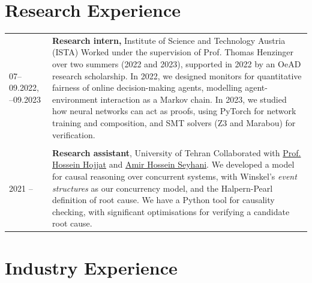 \documentclass[11pt]{article}
\begin{document}
\section*{Research Experience}

\begin{longtable}{p{} p{}}
  07--09.2022, \newline 06--09.2023 &
  \textbf{Research intern,}
  Institute of Science and Technology Austria (ISTA) \newline
  Worked under the supervision of Prof. Thomas Henzinger
  over two summers (2022 and 2023),
  supported in 2022 by an OeAD research scholarship.
  \vspace{2mm} \newline
  In 2022, we designed monitors for quantitative fairness
  of online decision-making agents,
  modelling agent-environment interaction as a Markov chain.
  In 2023, we studied how neural networks can act as proofs,
  using PyTorch for network training and composition,
  and SMT solvers (Z3 and Marabou) for verification. \\
  \\
  2021 -- \newline 2023 &
  \textbf{Research assistant},
  University of Tehran \newline 
  Collaborated with
  \href{https://www.cs.rit.edu/~hh/}{Prof. Hossein Hojjat} and 
  \href{https://www.linkedin.com/in/aseyhani/}{Amir Hossein Seyhani}.
  \vspace{2mm} \newline We developed a model for causal reasoning
  over concurrent systems,
  with Winskel's \emph{event structures} as our concurrency model,
  and the Halpern-Pearl definition of root cause.
  We have a Python tool for causality checking,
  with significant optimisations for verifying a candidate root cause.
\end{longtable}

\section*{Industry Experience}
\end{document}
